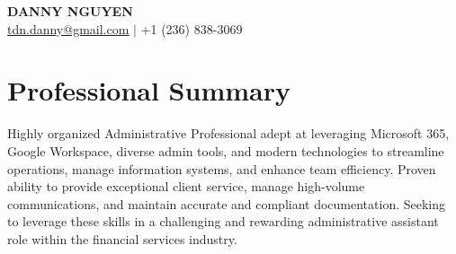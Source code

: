 \documentclass[letterpaper,11pt]{article}
\begin{document}
\begin{center}
\textbf{\Huge \scshape DANNY NGUYEN} \\ \vspace{1pt}
\small \href{mailto:tdn.danny@gmail.com}{\underline{tdn.danny@gmail.com}} $|$ +1 (236) 838-3069
\end{center}

\section{Professional Summary}
Highly organized Administrative Professional adept at leveraging Microsoft 365, Google Workspace, diverse admin tools, and modern technologies to streamline operations, manage information systems, and enhance team efficiency. Proven ability to provide exceptional client service, manage high-volume communications, and maintain accurate and compliant documentation.  Seeking to leverage these skills in a challenging and rewarding administrative assistant role within the financial services industry.
\end{document}
